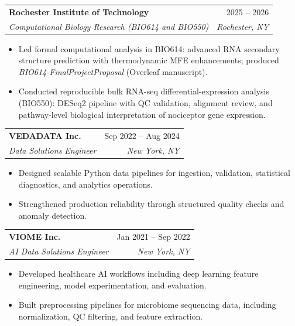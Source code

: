\documentclass[11pt]{article}
\makeatletter
\newcommand{\entry}[4]{
  \noindent\begin{tabularx}{\textwidth}{@{}Xr@{}}
    \textbf{#1} & #2 \\
    \textit{#3} & \textit{#4}
  \end{tabularx}\vspace{2pt}
}
\makeatother
\begin{document}
\entry{Rochester Institute of Technology}{2025 -- 2026}{Computational Biology Research (BIO614 and BIO550)}{Rochester, NY}
\begin{itemize}
  \item Led formal computational analysis in BIO614: advanced RNA secondary structure prediction with thermodynamic MFE enhancements; produced \textit{BIO614-FinalProjectProposal} (Overleaf manuscript).
  \item Conducted reproducible bulk RNA-seq differential-expression analysis (BIO550): DESeq2 pipeline with QC validation, alignment review, and pathway-level biological interpretation of nociceptor gene expression.
\end{itemize}

\entry{VEDADATA Inc.}{Sep 2022 -- Aug 2024}{Data Solutions Engineer}{New York, NY}
\begin{itemize}
  \item Designed scalable Python data pipelines for ingestion, validation, statistical diagnostics, and analytics operations.
  \item Strengthened production reliability through structured quality checks and anomaly detection.
\end{itemize}

\entry{VIOME Inc.}{Jan 2021 -- Sep 2022}{AI Data Solutions Engineer}{New York, NY}
\begin{itemize}
  \item Developed healthcare AI workflows including deep learning feature engineering, model experimentation, and evaluation.
  \item Built preprocessing pipelines for microbiome sequencing data, including normalization, QC filtering, and feature extraction.
\end{itemize}
\end{document}
